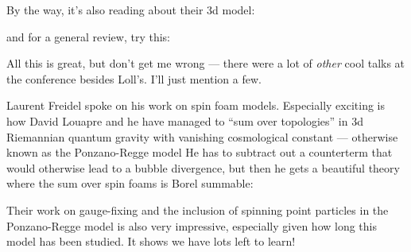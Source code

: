\documentclass{article}
\def\tightlist{}
\renewcommand{\texttt}[1]{%
  \begingroup
  \ttfamily
  \begingroup\lccode`~=`/\lowercase{\endgroup\def~}{/\discretionary{}{}{}}%
  \begingroup\lccode`~=`[\lowercase{\endgroup\def~}{[\discretionary{}{}{}}%
  \begingroup\lccode`~=`.\lowercase{\endgroup\def~}{.\discretionary{}{}{}}%
  \catcode`/=\active\catcode`[=\active\catcode`.=\active
  \scantokens{#1\noexpand}%
  \endgroup
}
\begin{document}
By the way, it's also reading about their 3d model:


and for a general review, try this:


All this is great, but don't get me wrong --- there were a lot of
\emph{other} cool talks at the conference besides Loll's. I'll just
mention a few.

Laurent Freidel spoke on his work on spin foam models. Especially
exciting is how David Louapre and he have managed to ``sum over
topologies'' in 3d Riemannian quantum gravity with vanishing
cosmological constant --- otherwise known as the Ponzano-Regge model He
has to subtract out a counterterm that would otherwise lead to a bubble
divergence, but then he gets a beautiful theory where the sum over spin
foams is Borel summable:


Their work on gauge-fixing and the inclusion of spinning point particles
in the Ponzano-Regge model is also very impressive, especially given how
long this model has been studied. It shows we have lots left to learn!
\end{document}
